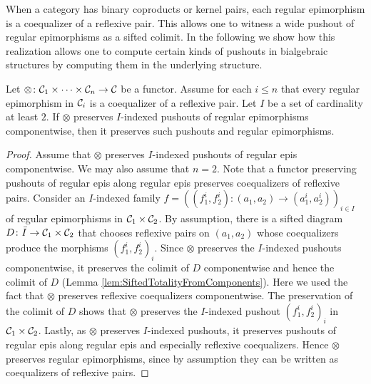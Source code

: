 When a category has binary coproducts or kernel pairs, each regular epimorphism is a coequalizer of a reflexive pair. This allows one to witness a wide pushout of regular epimorphisms as a sifted colimit. In the following we show how this realization allows one to compute certain kinds of pushouts in bialgebraic structures by computing them in the underlying structure.
\begin{corollary}\label{cor:fromComponentwisePreservationOfRegSubobjects}
    Let $\otimes\colon \mathcal{C}_1\times\cdots\times \mathcal{C}_n\to \mathcal{C}$ be a functor. Assume for each $i\leq n$ that every regular epimorphism in $\mathcal{C}_i$ is a coequalizer of a reflexive pair. Let $I$ be a set of cardinality at least $2$. If $\otimes$ preserves $I$-indexed pushouts of regular epimorphisms componentwise, then it preserves such pushouts and regular epimorphisms.
\end{corollary}
\begin{proof}
    Assume that $\otimes$ preserves $I$-indexed pushouts of regular epis componentwise. We may also assume that $n = 2$. Note that a functor preserving pushouts of regular epis along regular epis preserves coequalizers of reflexive pairs. Consider an $I$-indexed family $f = ((f^i_1,f^i_2)\colon (a_1,a_2)\to (a_1^i,a_2^i))_{i\in I}$ of regular epimorphisms in $\mathcal{C}_1\times \mathcal{C}_2$. By assumption, there is a sifted diagram $D\colon \bar{I}\to \mathcal{C}_1\times \mathcal{C}_2$ that chooses reflexive pairs on $(a_1,a_2)$ whose coequalizers produce the morphisms $(f^i_1,f^i_2)_i$. Since $\otimes$ preserves the $I$-indexed pushouts componentwise, it preserves the colimit of $D$ componentwise and hence the colimit of $D$ (Lemma \ref{lem:SiftedTotalityFromComponents}). Here we used the fact that $\otimes$ preserves reflexive coequalizers componentwise. The preservation of the colimit of $D$ shows that $\otimes$ preserves the $I$-indexed pushout $(f_1^i,f^i_2)_i$ in $\mathcal{C}_1\times \mathcal{C}_2$. Lastly, as $\otimes$ preserves $I$-indexed pushouts, it preserves pushouts of regular epis along regular epis and especially reflexive coequalizers. Hence $\otimes$ preserves regular epimorphisms, since by assumption they can be written as coequalizers of reflexive pairs.
\end{proof}

